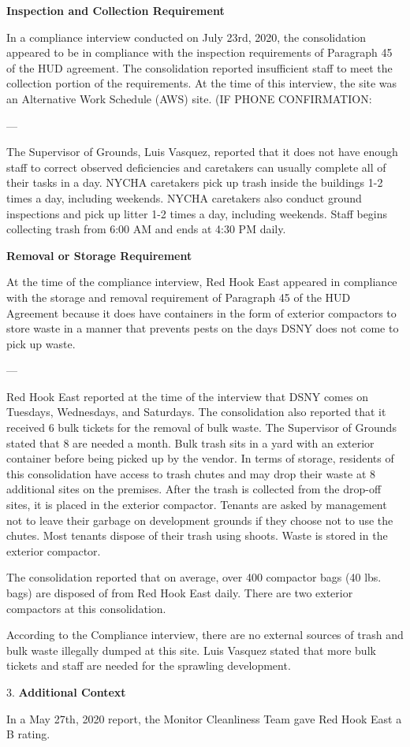 
\textbf{Inspection and Collection Requirement}

In a compliance interview conducted on July 23rd, 2020, the consolidation appeared to be in compliance with the inspection requirements of Paragraph 45 of the HUD agreement. The consolidation reported insufficient staff to meet the collection portion of the requirements. At the time of this interview, the site was an Alternative Work Schedule (AWS) site. (IF PHONE CONFIRMATION: 

---

The Supervisor of Grounds, Luis Vasquez, reported that it does not have enough staff to correct observed deficiencies and caretakers can usually complete all of their tasks in a day. NYCHA caretakers pick up trash inside the buildings 1-2 times a day, including weekends. NYCHA caretakers also conduct ground inspections and pick up litter 1-2 times a day, including weekends. Staff begins collecting trash from 6:00 AM and ends at 4:30 PM daily. 

\textbf{Removal or Storage Requirement}

At the time of the compliance interview, Red Hook East appeared in compliance with the storage and removal requirement of Paragraph 45 of the HUD Agreement because it does have containers in the form of exterior compactors to store waste in a manner that prevents pests on the days DSNY does not come to pick up waste. 

---

Red Hook East reported at the time of the interview that DSNY comes on Tuesdays, Wednesdays, and Saturdays. The consolidation also reported that it received 6 bulk tickets for the removal of bulk waste. The Supervisor of Grounds stated that 8 are needed a month. Bulk trash sits in a yard with an exterior container before being picked up by the vendor. In terms of storage, residents of this consolidation have access to trash chutes and may drop their waste at 8 additional sites on the premises. After the trash is collected from the drop-off sites, it is placed in the exterior compactor. Tenants are asked by management not to leave their garbage on development grounds if they choose not to use the chutes. Most tenants dispose of their trash using shoots. Waste is stored in the exterior compactor. 

The consolidation reported that on average, over 400 compactor bags (40 lbs. bags) are disposed of from Red Hook East daily. There are two exterior compactors at this consolidation.

According to the Compliance interview, there are no external sources of trash and bulk waste illegally dumped at this site. Luis Vasquez stated that more bulk tickets and staff are needed for the sprawling development.  

3. \textbf{Additional Context}

In a May 27th, 2020 report, the Monitor Cleanliness Team gave Red Hook East a B rating. 